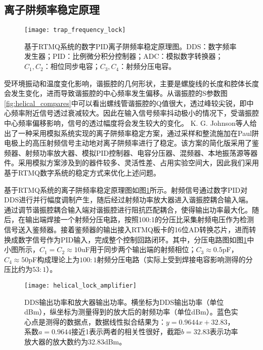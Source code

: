 \subsection[离子阱频率稳定原理和系统搭建]{离子阱频率稳定原理}
\begin{figure}
    \centering
    \caption[基于RTMQ系统的数字PID离子阱频率稳定原理图]{基于RTMQ系统的数字PID离子阱频率稳定原理图。DDS：数字频率发生器；PID：比例微分积分控制器；ADC：模拟数字转换器；$C_1,C_2$：相位同步电容；$C_3,C_4$：射频分压电容。\label{fig:trap_frequency_lock}}
    \texttt{[image: trap\_frequency\_lock]}
\end{figure}

受环境振动和温度变化影响，谐振腔的几何形状，主要是螺旋线的长度和腔体长度会发生变化，进而导致谐振腔的中心频率发生偏移。从谐振腔的S参数图\ref{fig:helical_compares}中可以看出螺线管谐振腔的Q值很大，透过峰较尖锐，即中心频率附近信号透过衰减较大。因此在输入信号频率抖动极小的情况下，受谐振腔中心频率偏移影响，信号的透过幅度将会发生较大的变化。
K. G. Johnson等人\cite[]{Johnson_Wong_Campos_Restelli_Landsman_Neyenhuis_Mizrahi_Monroe_2016}给出了一种采用模拟系统实现的离子阱频率稳定方案，通过采样和整流施加在Paul阱电极上的高压射频信号主动地对离子阱频率进行了稳定。该方案的简化版采用了鉴频器、射频功率放大器、模拟PID控制器、电容分压器、混频器、本地振荡源等器件。采用模拟方案涉及到的器件较多、灵活性差、占用实验空间大，因此我们采用基于RTMQ数字系统的稳定方式来优化上述问题。



基于RTMQ系统的离子阱频率稳定原理图如图\ref{fig:trap_frequency_lock}所示。射频信号通过数字PID对DDS进行并行幅度调制产生，随后经过射频功率放大器进入谐振腔耦合输入端。通过调节谐振腔耦合输入端对谐振腔进行阻抗匹配耦合，使得输出功率最大化。随后，在输出端焊接一个射频分压电路，按照100:1的分压比采集射频电压作为检测信号送入鉴频器。接着鉴频器的输出接入RTMQ板卡的16位AD转换芯片，进而转换成数字信号作为PID输入，完成整个控制回路闭环。其中，分压电路图如图\ref{fig:trap_frequency_lock}中小图所示，$C_1=C_2\approx10$uF用于同步两个输出端的射频相位；$C_3\approx0.5$pF，$C_4\approx50$pF构成理论上为$100:1$射频分压电路（实际上受到焊接电容影响测得的分压比约为$53:1$）。

\begin{figure}
    \centering
    \caption[DDS输出功率和放大器输出功率]{DDS输出功率和放大器输出功率。横坐标为DDS输出功率（单位dBm），纵坐标为测量得到的放大后的射频功率（单位dBm）。蓝色实心点是测得的数据点，数据线性拟合结果为：$y=0.9644x+32.83$，系数$a=0.9644$接近1表示两者的相关性很好，截距$b=32.83$表示功率放大器的放大数约为32.83dBm。\label{fig:helical_lock_amplifier}}
    \texttt{[image: helical\_lock\_amplifier]}
\end{figure}


